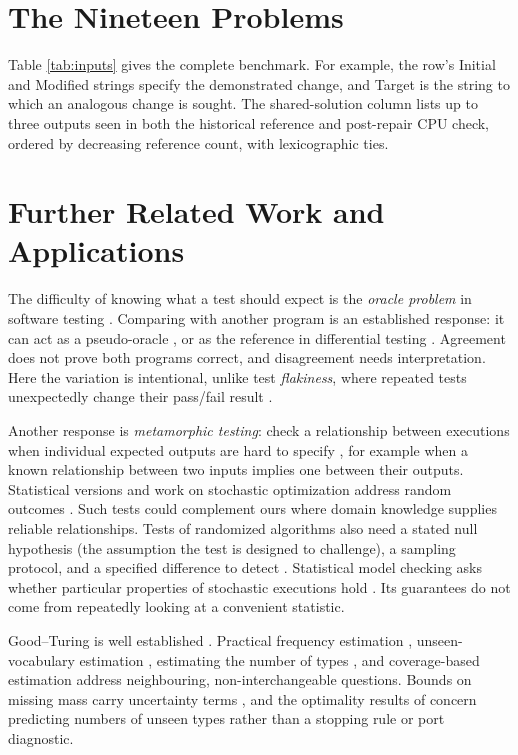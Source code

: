 \documentclass[10pt,letterpaper]{article}
\begin{document}
\clearpage

\section{The Nineteen Problems}\label{app:inputs}

Table \ref{tab:inputs} gives the complete benchmark. For example, the row's Initial and
Modified strings specify the demonstrated change, and Target is the string to which an
analogous change is sought. The shared-solution column lists up to three outputs seen in
both the historical reference and post-repair CPU check, ordered by decreasing reference
count, with lexicographic ties.



\clearpage

\section{Further Related Work and Applications}\label{app:related}

The difficulty of knowing what a test should expect is the \emph{oracle problem} in
software testing \citep{ref1, ref3, ref26}. Comparing with another program is an
established response: it can act as a pseudo-oracle \citep{ref2}, or as the reference in
differential testing \citep{ref4}. Agreement does not prove both programs correct, and
disagreement needs interpretation. Here the variation is intentional, unlike test
\emph{flakiness}, where repeated tests unexpectedly change their pass/fail result
\citep{ref17}.

Another response is \emph{metamorphic testing}: check a relationship between executions
when individual expected outputs are hard to specify \citep{ref7, ref5, ref28}, for
example when a known relationship between two inputs implies one between their outputs.
Statistical versions and work on stochastic optimization address random outcomes
\citep{ref6, ref27}. Such tests could complement ours where domain knowledge supplies
reliable relationships. Tests of randomized algorithms also need a stated null hypothesis
(the assumption the test is designed to challenge), a sampling protocol, and a specified
difference to detect \citep{ref31}. Statistical model checking asks whether particular
properties of stochastic executions hold \citep{ref15, ref16}. Its guarantees do not come
from repeatedly looking at a convenient statistic.

Good--Turing is well established \citep{ref8}. Practical frequency estimation
\citep{ref9}, unseen-vocabulary estimation \citep{ref11}, estimating the number of types
\citep{ref12}, and coverage-based estimation \citep{ref30} address neighbouring,
non-interchangeable questions. Bounds on missing mass carry uncertainty terms
\citep{ref10}, and the optimality results of \citet{ref29} concern predicting numbers of
unseen types rather than a stopping rule or port diagnostic.
\end{document}
